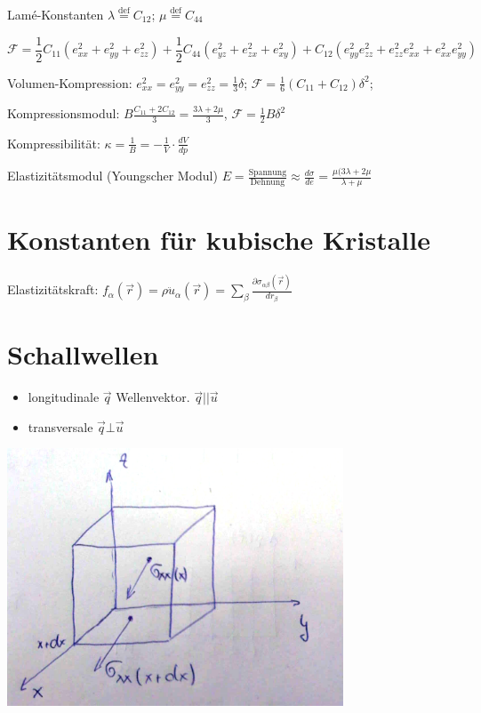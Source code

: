 Lamé-Konstanten \(\lambda \stackrel{\mathrm{def}}= C_{12}\);  \(\mu
\stackrel{\mathrm{def}}= C_{44}\)

\[ \mathcal F = \frac 1 2 C_{11} (e^2_{xx}+e^2_{yy}+e^2_{zz})+
\frac 1 2 C_{44} (e^2_{yz}+e^2_{zx}+e^2_{xy})+
C_{12} (e^2_{yy}e^2_{zz}+e^2_{zz}e^2_{xx}+e^2_{xx}e^2_{yy})
\]

Volumen-Kompression: \(e^2_{xx}=e^2_{yy}=e^2_{zz}=\frac 1 3 \delta\);
\(\mathcal F = \frac 1 6(C_{11}+C_{12})\delta^2\);

Kompressionsmodul: \(B\frac{C_{11}+2C_{12}}{3} =
\frac{3\lambda+2\mu}{3}\), \(\mathcal F = \frac 1 2 B\delta^2\)

Kompressibilität: \(\kappa = \frac 1 B = - \frac 1 V \cdot
\frac{dV}{dp}\)

Elastizitätsmodul (Youngscher Modul) \(E =
\frac{\text{Spannung}}{\text{Dehnung}} \approx \frac{d \sigma}{de} =
\frac{\mu(3\lambda + 2\mu}{\lambda +\mu}\)

\section{Konstanten für kubische Kristalle}

Elastizitätskraft: \(f_\alpha(\vec r) = \rho \ddot u_\alpha
(\vec r) = \sum_\beta \frac {\partial \sigma_{\alpha\beta}(\vec r)}{dr_\beta}\)

\section{Schallwellen}

\begin{itemize}
\item longitudinale 
\(\vec q\) Wellenvektor. \(\vec q || \vec u\)
\item transversale \(\vec q \bot  \vec u\)
\end{itemize}


\includegraphics[width=0.75\textwidth]{kap05_01.png}

